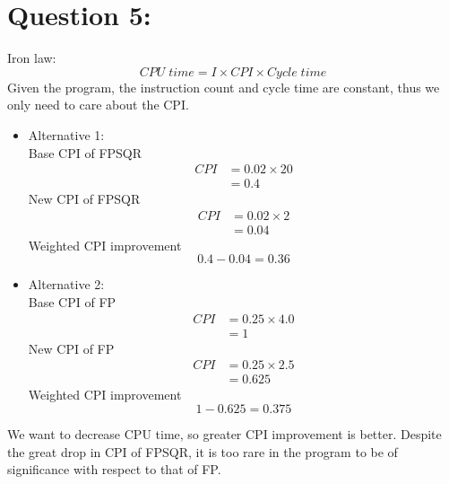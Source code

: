 \documentclass[12pt,a4paper]{article}
\begin{document}
\section*{Question 5:}
Iron law:
\begin{equation*}
  CPU\;time = I \times CPI \times Cycle\;time
\end{equation*}
Given the program, the instruction count and cycle time are constant, thus we only need to care about the CPI\@.
\begin{itemize}
  \item Alternative 1:\\
        Base CPI of FPSQR
        \begin{align*}
          CPI & = 0.02 \times 20 \\
              & = 0.4
        \end{align*}
        New CPI of FPSQR
        \begin{align*}
          CPI & = 0.02 \times 2 \\
              & = 0.04
        \end{align*}
        Weighted CPI improvement
        \begin{equation*}
          0.4 - 0.04 = 0.36
        \end{equation*}
  \item Alternative 2:\\
        Base CPI of FP
        \begin{align*}
          CPI & = 0.25 \times 4.0 \\
              & = 1
        \end{align*}
        New CPI of FP
        \begin{align*}
          CPI & = 0.25 \times 2.5 \\
              & = 0.625
        \end{align*}
        Weighted CPI improvement
        \begin{equation*}
          1 - 0.625 = 0.375
        \end{equation*}
\end{itemize}
We want to decrease CPU time, so greater CPI improvement is better. Despite the great drop in CPI of FPSQR, it is too rare in the program to be of significance with respect to that of FP\@.

\end{document}

